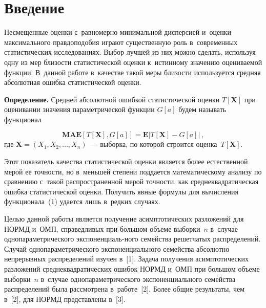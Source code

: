   
\vspace*{-8pt}


\thispagestyle{headings}

\begin{multicols}{2}

\label{st\stat}

\section{Введение}

\vspace*{-2pt}

  Несмещенные оценки с~равномерно минимальной дисперсией и~оценки
  максимального правдоподобия  играют существенную роль в~современных
  статистических исследованиях. Выбор лучшей из них можно сделать,
  используя одну из мер близости статистической оценки к~истинному значению
  оцениваемой функции. В~данной работе в~качестве такой меры близости
  используется средняя абсолютная ошибка статистической оценки.
  

\noindent
  \textbf{Определение.} 
  Средней абсолютной ошибкой статистической оценки $T[\mathbf{X}]$ при 
  оценивании значения параметрической функции $G[a]$ будем называть функционал
  
  \noindent
  \begin{equation}
  \mathbf{MAE}\left[T[\mathbf{X}],G[a]\right]=
  \mathbf{E}\left\vert T[\mathbf{X}]-G[a]\right\vert \,,
  \label{e1-ch}
  \end{equation}
  где $\mathbf{X}=\left(X_1,X_2,\ldots,X_n\right)$~--- выборка, 
  по которой строится оценка~$T[\mathbf{X}]$.
  

  Этот показатель качества статистической оценки является более 
  естественной мерой ее точности, но в~меньшей степени поддается 
  математическому анализу по сравнению с~такой распространенной мерой точности, 
  как среднеквадратическая ошибка статистической оценки. Получить явные формулы 
  для вычисления функционала~(1) удается лишь в~редких случаях.

  Целью данной работы является получение асимптотических разложений для 
  НОРМД и~ОМП, справедливых при большом объеме выборки~$n$ в~случае 
  однопараметрического экспоненциаль-\linebreak ного семейства решетчатых распределений.
  Случай однопараметрического экспоненциального семейства абсолютно 
  непрерывных распределений \mbox{изучен} в~[1]. Задача получения асимптотических разложений
  среднеквадратических ошибок \mbox{НОРМД} и~ОМП при большом объеме выборки~$n$
  в~случае однопараметрического экспоненциального семейства распределений
  была рассмотрена в~работе~[2]. Более общие результаты, чем в~[2],
  для НОРМД представлены в~[3].
  

\end{multicols}
